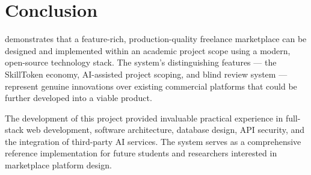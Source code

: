 \section{Conclusion}

\projectname{} demonstrates that a feature-rich, production-quality freelance marketplace can be designed and implemented within an academic project scope using a modern, open-source technology stack. The system's distinguishing features --- the SkillToken economy, AI-assisted project scoping, and blind review system --- represent genuine innovations over existing commercial platforms that could be further developed into a viable product.

The development of this project provided invaluable practical experience in full-stack web development, software architecture, database design, API security, and the integration of third-party AI services. The system serves as a comprehensive reference implementation for future students and researchers interested in marketplace platform design.
